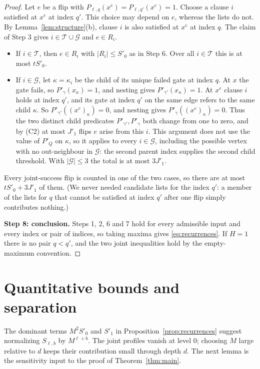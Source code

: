 \documentclass[11pt]{article}
\theoremstyle{definition}
\theoremstyle{remark}
\begin{document}
\begin{proof}
Let \(e\) be a flip with \(P_{\ell,q}(x^e)=P_{\ell,q'}(x^e)=1\). Choose a
clause \(i\) satisfied at \(x^e\) at index \(q'\). This choice may depend on
\(e\), whereas the lists do not. By Lemma~\ref{lem:structure}(b), clause \(i\) is
also satisfied at \(x^e\) at index \(q\). The claim of Step 3 gives
\(i\in\mathcal T\cup\mathcal G\) and \(e\in R_i\).
\begin{itemize}[leftmargin=2em]
\item If \(i\in\mathcal T\), then \(e\in R_i\) with \(|R_i|\le S'_0\) as in
Step 6. Over all \(i\in\mathcal T\) this is at most \(tS'_0\).
\item If \(i\in\mathcal G\), let \(\kappa=\kappa_i\) be the child of its
unique failed gate at index \(q\). At \(x\) the gate fails, so
\(P'_\gamma(x_\kappa)=1\), and nesting gives \(P'_{\gamma'}(x_\kappa)=1\).
At \(x^e\) clause \(i\) holds at index \(q'\), and its gate at index \(q'\)
on the same edge refers to the same child \(\kappa\). So
\(P'_{\gamma'}((x^e)_\kappa)=0\), and nesting gives
\(P'_\gamma((x^e)_\kappa)=0\). Thus the two distinct child predicates
\(P'_{\gamma'},P'_\gamma\) both change from one to zero, and by (C2) at most
\(J'_1\) flips \(e\) arise from this \(i\). This argument does not use the
value of \(P'_Q\) on \(\kappa\), so it applies to every \(i\in\mathcal G\),
including the possible vertex with no out-neighbour in \(\mathcal G\): the
second parent index supplies the second child threshold. With
\(|\mathcal G|\le3\) the total is at most \(3J'_1\).
\end{itemize}
Every joint-success flip is counted in one of the two cases, so there are at most
\(tS'_0+3J'_1\) of them. (We never needed candidate lists for the index
\(q'\): a member of the lists for \(q\) that cannot be satisfied at index
\(q'\) after one flip simply contributes nothing.)

\medskip\noindent\textbf{Step 8: conclusion.}
Steps 1, 2, 6 and 7 hold for every admissible input and every index or pair of
indices, so taking maxima gives \eqref{eq:recurrences}. If \(H=1\) there is no
pair \(q<q'\), and the two joint inequalities hold by the empty-maximum
convention.
\end{proof}

\section{Quantitative bounds and separation}
\label{sec:separation}

The dominant terms \(M^2S'_0\) and \(S'_1\) in
Proposition~\ref{prop:recurrences} suggest normalizing \(S_{\ell,b}\) by
\(M^{\ell+b}\). The joint profiles vanish at level \(0\); choosing \(M\) large
relative to \(d\) keeps their contribution small through depth \(d\). The next
lemma is the sensitivity input to the proof of Theorem~\ref{thm:main}.
\end{document}
